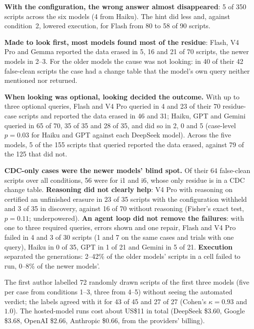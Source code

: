 \documentclass[runningheads]{llncs}
\begin{document}
\textbf{With the configuration, the wrong answer almost disappeared}: 5 of 350
scripts across the six models (4 from Haiku). The hint did less and, against
condition~2, lowered execution, for Flash from 80 to 58 of 90 scripts.

\textbf{Made to look first, most models found most of the residue}: Flash,
V4 Pro and Gemma reported the data erased in 5, 16 and 21 of 70 scripts, the
newer models in 2--3. For the older models the cause was not looking: in 40 of
their 42 false-clean scripts the case had a change table that the model's own
query neither mentioned nor returned.

\textbf{When looking was optional, looking decided the outcome.} With up to
three optional queries, Flash and V4 Pro queried in 4 and 23 of their 70
residue-case scripts and reported the data erased in 46 and 31; Haiku, GPT and
Gemini queried in 65 of 70, 35 of 35 and 28 of 35, and did so in 2, 0 and 5
(case-level $p = 0.03$ for Haiku and GPT against each DeepSeek model). Across
the five models, 5 of the 155 scripts that queried reported the data erased,
against 79 of the 125 that did not.

\textbf{CDC-only cases were the newer models' blind spot.} Of their 64
false-clean scripts over all conditions, 56 were for i1 and i6, whose only
residue is in a CDC change table. \textbf{Reasoning did not clearly help}: V4
Pro with reasoning on certified an unfinished erasure in 23 of 35 scripts with
the configuration withheld and 3 of 35 in discovery, against 16 of 70 without reasoning
(Fisher's exact test, $p = 0.11$; underpowered). \textbf{An agent loop did not
remove the failures}: with one to three required queries, errors shown and one
repair, Flash and V4 Pro failed in 4 and 3 of 30 scripts (1 and 7 on the same
cases and trials with one query), Haiku in 0 of 35, GPT in 1 of 21 and Gemini
in 5 of 21.
\textbf{Execution} separated the generations: 2--42\% of the older models'
scripts in a cell failed to run, 0--8\% of the newer models'.

The first author labelled 72 randomly drawn scripts of the first three models
(five per case from conditions 1--3, three from 4--5) without seeing the
automated verdict; the labels agreed with it for 43 of 45 and 27 of 27 (Cohen's
$\kappa = 0.93$ and $1.0$). The hosted-model runs cost about US\$11 in total
(DeepSeek \$3.60, Google \$3.68, OpenAI \$2.66, Anthropic \$0.66, from the
providers' billing).

\end{document}
